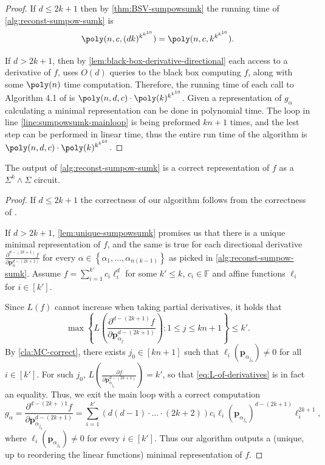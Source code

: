 \documentclass[12pt]{article}
\renewcommand{\set}[1]{\left\{ #1 \right\}}
\newcommand{\F}{\mathbb{F}}
\newcommand{\SumPowSumk}{\Sigma^k \!\wedge\! \Sigma}
\renewcommand{\vec}[1]{{\mathbf{#1}}}
\newcommand{\Moments}{\vec{p}}
\begin{document}
	\begin{proof}
		If $d\leq 2k+1$ then by \autoref{thm:BSV-sumpowsumk} the running time of \autoref{alg:reconst-sumpow-sumk} is \[
		\poly(n,c, (dk)^{k^{k^{10}}})=\poly(n,c, k^{k^{k^{10}}}).
		\]
		
		If $d > 2k+1$, then by \autoref{lem:black-box-derivative-directional} each access to a derivative of $f$, uses $O(d)$ queries to the black box computing $f$, along with some $\poly(n)$ time computation. Therefore, the running time of each call to Algorithm 4.1 of \cite{BSV21} is $ \poly(n,d,c) \cdot \poly( k)^{k^{k^{10}}}$. Given a representation of $g_\alpha$ calculating a minimal representation can be done in polynomial time. The loop in line \ref{line:sumpowsumk-mainloop} is being preformed $kn+1$ times, and the lest step can be performed in linear time, thus the entire run time of the algorithm is $\poly(n,d,c) \cdot  \poly(k)^{k^{k^{10}}}$. 
	\end{proof}
	
	
	
	\begin{lemma}
		\label{lem:sumpowsumk-alg-correctness}
		The output of \autoref{alg:reconst-sumpow-sumk} is a correct representation of $f$ as a $\SumPowSumk$ circuit.
	\end{lemma}
	\begin{proof}
		If $d\leq 2k+1$ the correctness of our algorithm follows from the correctness of \cite{BSV21}.
		
		If $d>2k+1$, \autoref{lem:unique-sumpowsumk} promises us that there is a unique minimal representation of $f$, and the same is true for each directional derivative $\frac{\partial^{d-(2k+1)} f}{\partial \Moments_\alpha^{d-(2k+1)}}$ for every $\alpha \in \set{\alpha_1, \ldots, \alpha_{n(k-1)}}$ as picked in \autoref{alg:reconst-sumpow-sumk}. Assume $f = \sum_{i=1}^{k'} c_i\ell_i^d$ for some $k' \le k$, $c_i \in \F$ and affine functions $\ell_i$ for $i \in [k']$.
		
		Since $L(f)$ cannot increase when taking partial derivatives, it holds that
		\begin{equation}
			\label{eq:L-of-derivatives}
			\max \set{L \left( \frac{\partial^{d-(2k+1)} f}{\partial \Moments_{\alpha_j}^{d-(2k+1)}} \right) : 1 \le j \le kn+1} \leq k'.
		\end{equation}
		By \autoref{cla:MC-correct}, there exists $j_0 \in [kn+1]$ such that $\ell_i(\Moments_{\alpha_{j_0}}) \neq 0$ for all $i \in [k']$. For such $j_0$, $L \left( \frac{\partial f}{\partial \Moments_{\alpha_{j_0}}^{d-(2k+1)}} \right) = k'$,  so that \eqref{eq:L-of-derivatives} is in fact an equality. Thus, we exit the main loop with a correct computation 
		\[g_\alpha = \frac{\partial^{d-(2k+)1} f}{\partial \Moments_{\alpha_{j_0}}^{d-(2k+1)}} = \sum_{i=1}^{k'}
		(d(d-1)\cdot\ldots\cdot(2k+2)) c_i  \ell_i(\Moments_{\alpha_{j_0}})^{d-(2k+1)}\ell_i^{2k+1}, \]
		where $\ell_i(\Moments_{\alpha_{j_0}})\neq 0$ for every $i\in [k']$. Thus our algorithm outputs a (unique, up to reordering the linear functions) minimal representation of $f$.
	\end{proof}
	
\end{document}
